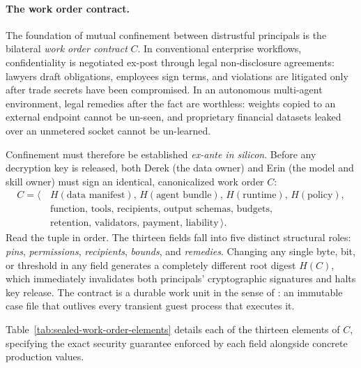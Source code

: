 \documentclass[11pt,a4paper]{article}
\theoremstyle{definition}
\begin{document}
\paragraph{The work order contract.}
The foundation of mutual confinement between distrustful principals is the
bilateral \emph{work order contract} $C$. In conventional enterprise workflows,
confidentiality is negotiated ex-post through legal non-disclosure agreements:
lawyers draft obligations, employees sign terms, and violations are litigated
only after trade secrets have been compromised. In an autonomous multi-agent
environment, legal remedies after the fact are worthless: weights copied to an
external endpoint cannot be un-seen, and proprietary financial datasets leaked
over an unmetered socket cannot be un-learned.

Confinement must therefore be established \emph{ex-ante in silicon}. Before any
decryption key is released, both Derek (the data owner) and Erin (the model and
skill owner) must sign an identical, canonicalized work order $C$:
{\small\[
\begin{aligned}
C=\bigl\langle\, & H(\text{data manifest}),\,H(\text{agent bundle}),\,H(\text{runtime}),\,H(\text{policy}),\\
& \text{function},\,\text{tools},\,\text{recipients},\,\text{output schemas},\,\text{budgets},\\
& \text{retention},\,\text{validators},\,\text{payment},\,\text{liability}\,\bigr\rangle.
\end{aligned}
\]}
Read the tuple in order. The thirteen fields fall into five distinct structural
roles: \emph{pins}, \emph{permissions}, \emph{recipients}, \emph{bounds}, and
\emph{remedies}. Changing any single byte, bit, or threshold in any field
generates a completely different root digest $H(C)$, which immediately
invalidates both principals' cryptographic signatures and halts key release.
The contract is a durable work unit in the sense of : an immutable case file that outlives every transient
guest process that executes it.

Table~\ref{tab:sealed-work-order-elements} details each of the thirteen elements
of $C$, specifying the exact security guarantee enforced by each field alongside
concrete production values.
\end{document}
